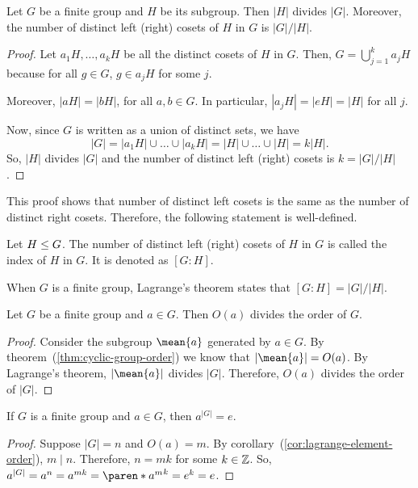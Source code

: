 \documentclass[11pt]{penrose}
\newcommand{\cyclic}[1]{\mean{#1}}
\begin{document}
\begin{nthm}[Lagrange]
    Let $G$ be a finite group and $H$ be its subgroup. Then $|H|$ divides $|G|$. Moreover, the number of distinct left (right) cosets of $H$ in $G$ is $|G|/|H|$.
\end{nthm}
\begin{proof}
    Let $a_1 H, \dots, a_k H$ be all the distinct cosets of $H$ in $G$. Then, $G = \bigcup_{j=1}^{k} a_j H$ because for all $g \in G$, $g \in a_j H$ for some $j$.

    Moreover, $|aH| = |bH|$, for all $a, b \in G$. In particular, $|a_j H| = |e H| = |H|$ for all $j$.

    Now, since $G$ is written as a union of distinct sets, we have
    \begin{equation*}
        |G| = |a_1 H| \cup \dots \cup |a_k H| = |H| \cup \dots \cup |H| = k |H|.
    \end{equation*}
    So, $|H|$ divides $|G|$ and the number of distinct left (right) cosets is $k = |G|/|H|$.
\end{proof}

This proof shows that number of distinct left cosets is the same as the number of distinct right cosets. Therefore, the following statement is well-defined.

\begin{ndfn}
    Let $H \mathrel{\leq} G$. The number of distinct left (right) cosets of $H$ in $G$ is called the index of $H$ in $G$. It is denoted as $[G:H]$.
\end{ndfn}

When $G$ is a finite group, Lagrange's theorem states that $[G:H] = |G|/|H|$.

\begin{ncor}\label{cor:lagrange-element-order}
    Let $G$ be a finite group and $a \in G$. Then $O(a)$ divides the order of $G$.
\end{ncor}
\begin{proof}
    Consider the subgroup $\cyclic{a}$ generated by $a \in G$. By theorem~(\ref{thm:cyclic-group-order}) we know that $|\cyclic{a}| = O(a)$. By Lagrange's theorem, $|\cyclic{a}|$ divides $|G|$. Therefore, $O(a)$ divides the order of $|G|$.
\end{proof}

\begin{ncor}
    If $G$ is a finite group and $a \in G$, then $a^{|G|} = e$.
\end{ncor}
\begin{proof}
    Suppose $|G| = n$ and $O(a) = m$. By corollary~(\ref{cor:lagrange-element-order}), $m \mid n$. Therefore, $n = mk$ for some $k \in \mathbb{Z}$. So, $a^{|G|} = a^n = a^{mk} = \paren*{a^{m}}^{k} = e^k = e$.
\end{proof}
\end{document}
